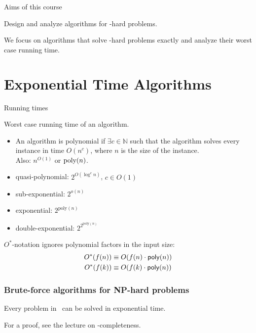 \begin{frame}{Aims of this course}

	\centering
	Design and analyze algorithms for \NP-hard problems.

	\bigskip

	\centering
	We focus on algorithms that solve \NP-hard problems \alert{exactly} and analyze their \alert{worst case running time}.
\end{frame}

\section{Exponential Time Algorithms}

\begin{frame}{Running times}

	Worst case running time of an algorithm.
	\begin{itemize}
		\item An algorithm is \alert{polynomial} if $\exists c\in \mathbb{N}$ such that the algorithm solves every instance in time $O(n^c)$, where $n$ is the size of the instance.\\
		      Also: $n^{O(1)}$ or $\text{\normalfont {poly}}(n)$.
		\item \alert{quasi-polynomial}: $2^{O(\log^c n)}$, $c\in O(1)$
		\item \alert{sub-exponential}: $2^{o(n)}$
		\item \alert{exponential}: $2^{\text{poly}(n)}$
		\item \alert{double-exponential}: $2^{2^{\text{poly}(n)}}$
	\end{itemize}

	\medskip
	$O^*$-notation ignores polynomial factors in the input size:
	\begin{align*}
		O^*(f(n)) & \equiv O(f(n) \cdot \mathsf{poly}(n)) \\
		O^*(f(k)) & \equiv O(f(k) \cdot \mathsf{poly}(n))
	\end{align*}

\end{frame}

\begin{frame}
	\frametitle{Brute-force algorithms for NP-hard problems}

	\begin{theorem}
		Every problem in \NP\ can be solved in exponential time.
	\end{theorem}
	\pause{}
	For a proof, see the lecture on \NP-completeness.
\end{frame}

